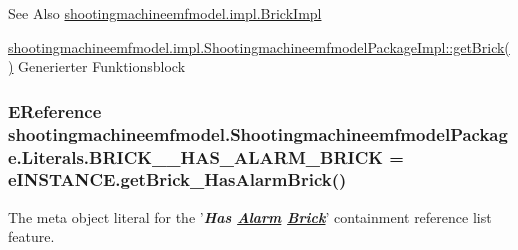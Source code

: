 \begin{DoxySeeAlso}{See Also}
\hyperlink{classshootingmachineemfmodel_1_1impl_1_1_brick_impl}{shootingmachineemfmodel.\-impl.\-Brick\-Impl} 

\hyperlink{classshootingmachineemfmodel_1_1impl_1_1_shootingmachineemfmodel_package_impl_aaef94e2843dca6a355980df230d01339}{shootingmachineemfmodel.\-impl.\-Shootingmachineemfmodel\-Package\-Impl\-::get\-Brick()} Generierter Funktionsblock 
\end{DoxySeeAlso}
\hypertarget{interfaceshootingmachineemfmodel_1_1_shootingmachineemfmodel_package_1_1_literals_afbd4cc7a09e1ba73ef82ce8898cb2eb7}{
\subsubsection[{B\-R\-I\-C\-K\-\_\-\-\_\-\-H\-A\-S\-\_\-\-A\-L\-A\-R\-M\-\_\-\-B\-R\-I\-C\-K}]{\setlength{\rightskip}{0pt plus 5cm}E\-Reference shootingmachineemfmodel.\-Shootingmachineemfmodel\-Package.\-Literals.\-B\-R\-I\-C\-K\-\_\-\-\_\-\-H\-A\-S\-\_\-\-A\-L\-A\-R\-M\-\_\-\-B\-R\-I\-C\-K = e\-I\-N\-S\-T\-A\-N\-C\-E.\-get\-Brick\-\_\-\-Has\-Alarm\-Brick()}}\label{interfaceshootingmachineemfmodel_1_1_shootingmachineemfmodel_package_1_1_literals_afbd4cc7a09e1ba73ef82ce8898cb2eb7}
The meta object literal for the '{\itshape {\bfseries Has \hyperlink{interfaceshootingmachineemfmodel_1_1_alarm}{Alarm} \hyperlink{interfaceshootingmachineemfmodel_1_1_brick}{Brick}}}' containment reference list feature.

